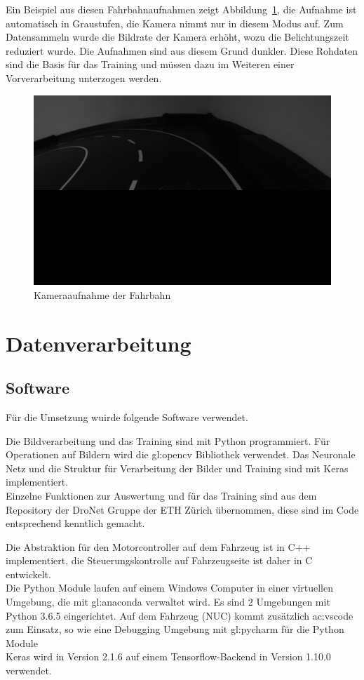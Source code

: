 Ein Beispiel aus diesen Fahrbahnaufnahmen zeigt Abbildung~\ref{img:rohbild}, die Aufnahme ist automatisch in Graustufen, die Kamera nimmt nur in diesem Modus auf. Zum Datensammeln wurde die Bildrate der Kamera erhöht, wozu die Belichtungszeit reduziert wurde. Die Aufnahmen sind aus diesem Grund dunkler.
Diese Rohdaten sind die Basis für das Training und müssen dazu im Weiteren einer Vorverarbeitung unterzogen werden. 

\begin{figure}[h]
	\centering
	\includegraphics[scale=0.4]{figures/Rohbild.png}
	\caption{Kameraaufnahme der Fahrbahn}
	\label{img:rohbild}
\end{figure}


\section{Datenverarbeitung}

\subsection{Software}
Für die Umsetzung wuirde folgende Software verwendet.

Die Bildverarbeitung und das Training sind mit Python programmiert. Für Operationen auf Bildern wird die \gls{gl:opencv} Bibliothek verwendet. Das Neuronale Netz und die Struktur für Verarbeitung der Bilder und Training sind mit Keras implementiert.\\
Einzelne Funktionen zur Auswertung und für das Training sind aus dem Repository der DroNet Gruppe der ETH Zürich übernommen, diese sind im Code entsprechend kenntlich gemacht.

Die Abstraktion für den Motorcontroller auf dem Fahrzeug ist in C++ implementiert, die Steuerungskontrolle auf Fahrzeugseite ist daher in C entwickelt.\\
Die Python Module laufen auf einem Windows Computer in einer virtuellen Umgebung, die mit \gls{gl:anaconda} verwaltet wird. Es sind 2 Umgebungen mit Python 3.6.5 eingerichtet. Auf dem Fahrzeug (NUC) kommt zusätzlich \gls{ac:vscode} zum Einsatz, so wie eine Debugging Umgebung mit \gls{gl:pycharm} für die Python Module\\
Keras wird in Version 2.1.6 auf einem Tensorflow-Backend in Version 1.10.0 verwendet.

